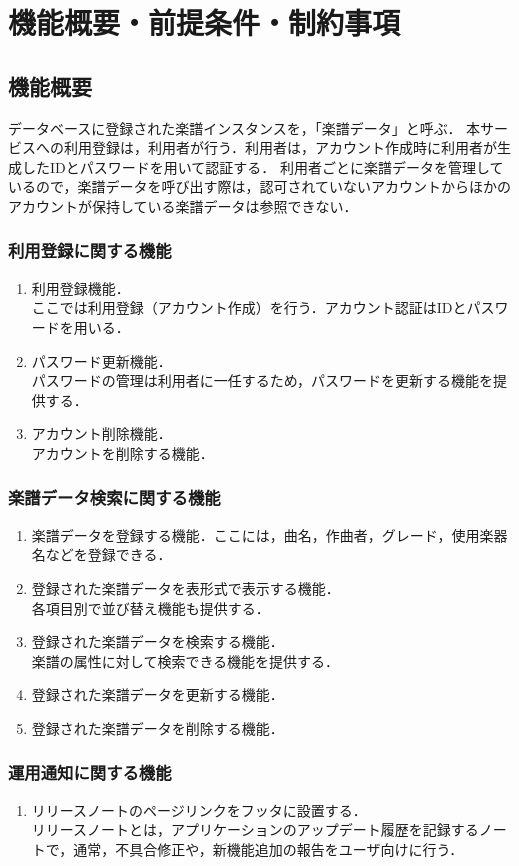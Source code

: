 \chapter{機能概要・前提条件・制約事項}
\section{機能概要}
データベースに登録された楽譜インスタンスを，「楽譜データ」と呼ぶ．
本サービスへの利用登録は，利用者が行う．利用者は，アカウント作成時に利用者が生成したIDとパスワードを用いて認証する．
利用者ごとに楽譜データを管理しているので，楽譜データを呼び出す際は，認可されていないアカウントからほかのアカウントが保持している楽譜データは参照できない．
\subsection{利用登録に関する機能}
\begin{enumerate}
	\item 利用登録機能．\\
	      ここでは利用登録（アカウント作成）を行う．アカウント認証はIDとパスワードを用いる．
	\item パスワード更新機能．\\
	      パスワードの管理は利用者に一任するため，パスワードを更新する機能を提供する．
	\item アカウント削除機能．\\
	      アカウントを削除する機能．
\end{enumerate}
\subsection{楽譜データ検索に関する機能}
\begin{enumerate}
	\item 楽譜データを登録する機能．ここには，曲名，作曲者，グレード，使用楽器名などを登録できる．
	\item 登録された楽譜データを表形式で表示する機能．\\
	      各項目別で並び替え機能も提供する．
	\item 登録された楽譜データを検索する機能．\\
	      楽譜の属性に対して検索できる機能を提供する．
	\item 登録された楽譜データを更新する機能．
	\item 登録された楽譜データを削除する機能．
\end{enumerate}
\subsection{運用通知に関する機能}
\begin{enumerate}
	\item リリースノートのページリンクをフッタに設置する．\\
	      リリースノートとは，アプリケーションのアップデート履歴を記録するノートで，通常，不具合修正や，新機能追加の報告をユーザ向けに行う．
\end{enumerate}
